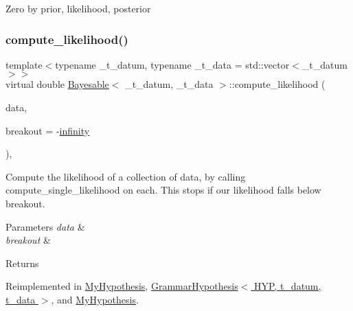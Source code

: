 Zero by prior, likelihood, posterior\mbox{\label{class_bayesable_af9547335ae15a5068b10d29aee5056ae}} 
\subsubsection{\texorpdfstring{compute\+\_\+likelihood()}{compute\_likelihood()}}
{\footnotesize\ttfamily template$<$typename \+\_\+t\+\_\+datum, typename \+\_\+t\+\_\+data = std\+::vector$<$\+\_\+t\+\_\+datum$>$$>$ \\
virtual double \hyperlink{class_bayesable}{Bayesable}$<$ \+\_\+t\+\_\+datum, \+\_\+t\+\_\+data $>$\+::compute\+\_\+likelihood (\begin{DoxyParamCaption}\item[{const \hyperlink{class_bayesable_a70a593a67c7d43239ecc06bb4fd06a6b}{t\+\_\+data} \&}]{data,  }\item[{const double}]{breakout = {\ttfamily -\/\hyperlink{_numerics_8h_a1bb1e42ae1b40cad6e99da0aab8a5576}{infinity}} }\end{DoxyParamCaption})\hspace{0.3cm}{\ttfamily [inline]}, {\ttfamily [virtual]}}



Compute the likelihood of a collection of data, by calling compute\+\_\+single\+\_\+likelihood on each. This stops if our likelihood falls below breakout. 


\begin{DoxyParams}{Parameters}
{\em data} & \\
\hline
{\em breakout} & \\
\hline
\end{DoxyParams}
\begin{DoxyReturn}{Returns}

\end{DoxyReturn}


Reimplemented in \hyperlink{class_my_hypothesis_a9caaf0511be161a52f7e93c2086374bc}{My\+Hypothesis}, \hyperlink{class_grammar_hypothesis_ae565db71afc24d042450e9ed471b4908}{Grammar\+Hypothesis$<$ H\+Y\+P, t\+\_\+datum, t\+\_\+data $>$}, and \hyperlink{class_my_hypothesis_a85348639689176eaf456aaadd63cef2f}{My\+Hypothesis}.

\mbox{\label{class_bayesable_a6fb74010b3725f610f52746cc652f92a}} 

